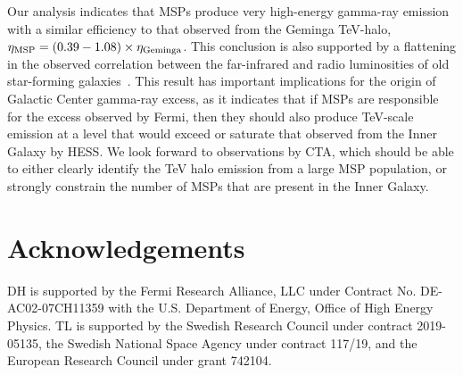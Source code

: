 \documentclass[aps,prd,twocolumn,amsmath,superscriptaddress,amssymb,showpacs,floatfix,nofootinbib,longbibliography,preprintnumbers]{revtex4-1}
\begin{document}
Our analysis indicates that MSPs produce very high-energy gamma-ray emission with a similar efficiency to that observed from the Geminga TeV-halo, $\eta_{\rm MSP} = (0.39-1.08) \times \eta_{\rm Geminga}$. This conclusion is also supported by a flattening in the observed correlation between the far-infrared and radio luminosities of old star-forming galaxies~\cite{Sudoh:2020hyu}. This result has important implications for the origin of Galactic Center gamma-ray excess, as it indicates that if MSPs are responsible for the excess observed by Fermi, then they should also produce TeV-scale emission at a level that would exceed or saturate that observed from the Inner Galaxy by HESS. We look forward to observations by CTA, which should be able to either clearly identify the TeV halo emission from a large MSP population, or strongly constrain the number of MSPs that are present in the Inner Galaxy.













\bigskip

\section*{Acknowledgements}

\noindent DH is supported by the Fermi Research Alliance, LLC under Contract No. DE-AC02-07CH11359 with the U.S. Department of Energy, Office of High Energy Physics. TL is supported by the Swedish Research Council under contract 2019-05135, the Swedish National Space Agency under contract 117/19, and the European Research Council under grant 742104. 



\end{document}
